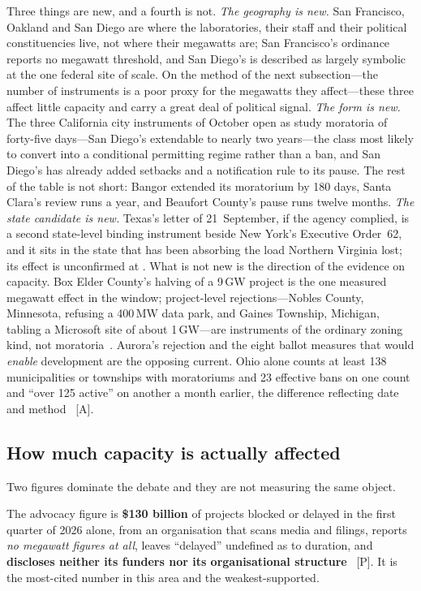 Three things are new, and a fourth is not. \emph{The geography is new.} San Francisco, Oakland and San Diego are where the laboratories, their staff and their political constituencies live, not where their megawatts are; San Francisco's ordinance reports no megawatt threshold, and San Diego's is described as largely symbolic at the one federal site of scale. On the method of the next subsection---the number of instruments is a poor proxy for the megawatts they affect---these three affect little capacity and carry a great deal of political signal. \emph{The form is new.} The three California city instruments of October open as study moratoria of forty-five days---San Diego's extendable to nearly two years---the class most likely to convert into a conditional permitting regime rather than a ban, and San Diego's has already added setbacks and a notification rule to its pause. The rest of the table is not short: Bangor extended its moratorium by 180 days, Santa Clara's review runs a year, and Beaufort County's pause runs twelve months. \emph{The state candidate is new.} Texas's letter of 21~September, if the agency complied, is a second state-level binding instrument beside New York's Executive Order~62, and it sits in the state that has been absorbing the load Northern Virginia lost; its effect is unconfirmed at \datafreeze. What is not new is the direction of the evidence on capacity. Box Elder County's halving of a 9\,GW project is the one measured megawatt effect in the window; project-level rejections---Nobles County, Minnesota, refusing a 400\,MW data park, and Gaines Township, Michigan, tabling a Microsoft site of about 1\,GW---are instruments of the ordinary zoning kind, not moratoria~\cite{cap-dc-obstacles}. Aurora's rejection and the eight ballot measures that would \emph{enable} development are the opposing current. Ohio alone counts at least 138 municipalities or townships with moratoriums and 23 effective bans on one count and ``over 125 active'' on another a month earlier, the difference reflecting date and method~\cite{cap-ballot-measures} [A].

\subsection{How much capacity is actually affected}

Two figures dominate the debate and they are not measuring the same object.

The advocacy figure is \textbf{\$130 billion} of projects blocked or delayed in the first quarter of 2026 alone, from an organisation that scans media and filings, reports \emph{no megawatt figures at all}, leaves ``delayed'' undefined as to duration, and \textbf{discloses neither its funders nor its organisational structure}~\cite{moratorium-scale} [P]. It is the most-cited number in this area and the weakest-supported.

